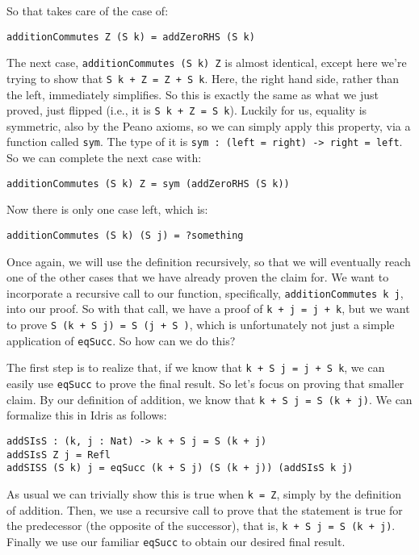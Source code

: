 \documentclass{article}
\newcommand{\inline}[1]{\texttt{#1}}
\begin{document}
So that takes care of the case of:

\begin{verbatim}
additionCommutes Z (S k) = addZeroRHS (S k)
\end{verbatim}

The next case, \inline{additionCommutes (S k) Z} is almost identical, except here we’re trying to show that \inline{S k + Z = Z + S k}.
Here, the right hand side, rather than the left, immediately simplifies.
So this is exactly the same as what we just proved, just flipped (i.e., it is \inline{S k + Z = S k}).
Luckily for us, equality is symmetric, also by the Peano axioms, so we can simply apply this property, via a function called \inline{sym}.
The type of it is \inline{sym : (left = right) -> right = left}.
So we can complete the next case with:

\begin{verbatim}
additionCommutes (S k) Z = sym (addZeroRHS (S k))
\end{verbatim}

Now there is only one case left, which is:

\begin{verbatim}
additionCommutes (S k) (S j) = ?something
\end{verbatim}

Once again, we will use the definition recursively, so that we will eventually reach one of the other cases that we have already proven the claim for.
We want to incorporate a recursive call to our function, specifically, \inline{additionCommutes k j}, into our proof.
So with that call, we have a proof of \inline{k + j = j + k}, but we want to prove \inline{S (k + S j) = S (j + S )}, which is unfortunately not just a simple application of \inline{eqSucc}.
So how can we do this?

The first step is to realize that, if we know that \inline{k + S j = j + S k}, we can easily use \inline{eqSucc} to prove the final result.
So let’s focus on proving that smaller claim.
By our definition of addition, we know that \inline{k + S j = S (k + j)}.
We can formalize this in Idris as follows:

\begin{verbatim}
addSIsS : (k, j : Nat) -> k + S j = S (k + j)
addSIsS Z j = Refl
addSISS (S k) j = eqSucc (k + S j) (S (k + j)) (addSIsS k j)
\end{verbatim}

As usual we can trivially show this is true when \inline{k = Z}, simply by the definition of addition.
Then, we use a recursive call to prove that the statement is true for the predecessor (the opposite of the successor), that is, \inline{k + S j = S (k + j)}.
Finally we use our familiar \inline{eqSucc} to obtain our desired final result.
\end{document}
